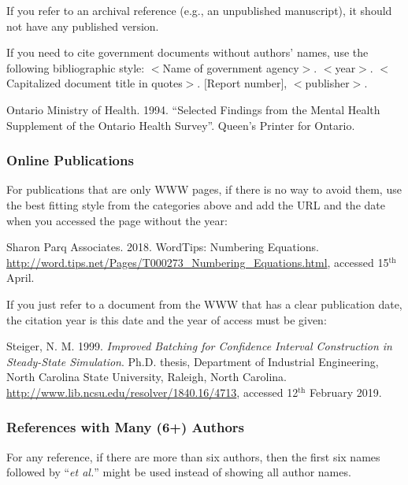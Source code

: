 \documentclass{wscpaperproc}
\theoremstyle{wsc}
\begin{document}
If you refer to an archival reference (e.g., an unpublished manuscript), it should not have any published version.

If you need to cite government documents without authors' names, use the following bibliographic style: $<$Name of government agency$>$. $<$year$>$. $<$Capitalized document title in quotes$>$. $[$Report number$]$, $<$publisher$>$.

{\footnotesize
\begin{hangref}
\item Ontario Ministry of Health. 1994. ``Selected Findings from the Mental Health Supplement of the Ontario Health Survey''. Queen's Printer for Ontario.
\end{hangref}
}

\subsubsection{Online Publications}
For publications that are only WWW pages, if there is no way to avoid them, use the best fitting style from the categories above and add the URL and the date when you accessed the page without the year:

{\sloppy
{\footnotesize
\begin{hangref}
\item Sharon Parq Associates. 2018. WordTips: Numbering Equations. \href{http://word.tips.net/Pages/T000273_Numbering_Equations.html}{http://word.tips.net/Pages/T000273\_Numbering\_Equations.html}, accessed 15$^{\textrm{th}}$ April.
\end{hangref}
}
}

If you just refer to a document from the WWW that has a clear publication date, the citation year is this date and the year of access must be given:

{\sloppy
{\footnotesize
\begin{hangref}
\item Steiger, N. M. 1999. \textit{Improved Batching for Confidence Interval Construction in Steady-State Simulation}. Ph.D. thesis, Department of Industrial Engineering, North Carolina State University, Raleigh, North Carolina. \href{http://www.lib.ncsu.edu/resolver/1840.16/4713}{http://www.lib.ncsu.edu/resolver/1840.16/4713}, accessed 12$^{\textrm{th}}$ February 2019.
\end{hangref}
}
}

\subsubsection{References with Many (6+) Authors}
For any reference, if there are more than six authors, then the first six names followed by ``\textit{et al.}'' might be used instead of showing all author names.
\end{document}
